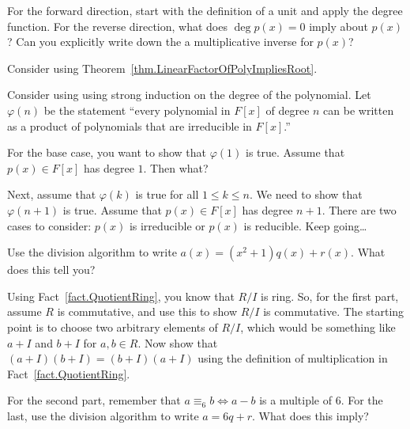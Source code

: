 \begin{hint*}
For the forward direction, start with the definition of a unit and apply the degree function. For the reverse direction, what does $\deg p(x) = 0$ imply about $p(x)$? Can you explicitly write down the a multiplicative inverse for $p(x)$?
\end{hint*}

\begin{hint*}
Consider using Theorem~\ref{thm.LinearFactorOfPolyImpliesRoot}.
\end{hint*}

\begin{hint*}
Consider using using strong induction on the degree of the polynomial. Let $\varphi(n)$ be the statement ``every polynomial in $F[x]$ of degree $n$ can be written as a product of polynomials that are irreducible in $F[x]$.'' 

For the base case, you want to show that $\varphi(1)$ is true. Assume that $p(x)\in F[x]$ has degree $1$. Then what? 

Next, assume that $\varphi(k)$ is true for all $1\le k \le n$. We need to show that $\varphi(n+1)$ is true. Assume that $p(x)\in F[x]$ has degree $n+1$. There are two cases to consider: $p(x)$ is irreducible or $p(x)$ is reducible. Keep going\ldots
\end{hint*}

\begin{hint*}
Use the division algorithm to write $a(x) = (x^2+1)q(x) + r(x)$. What does this tell you?
\end{hint*}


\begin{hint*}
Using Fact~\ref{fact.QuotientRing}, you know that $R/I$ is ring. So, for the first part, assume $R$ is commutative, and use this to show $R/I$ is commutative. The starting point is to choose two arbitrary elements of $R/I$, which would be something like $a+I$ and $b+I$ for $a,b\in R$. Now show that $(a+I)(b+I) = (b+I)(a+I)$ using the definition of multiplication in Fact~\ref{fact.QuotientRing}. 
\end{hint*}

\begin{hint*}
For the second part, remember that $a\equiv_6 b \iff a-b$ is a multiple of $6$. For the last, use the division algorithm to write $a = 6q + r$. What does this imply? 
\end{hint*}

